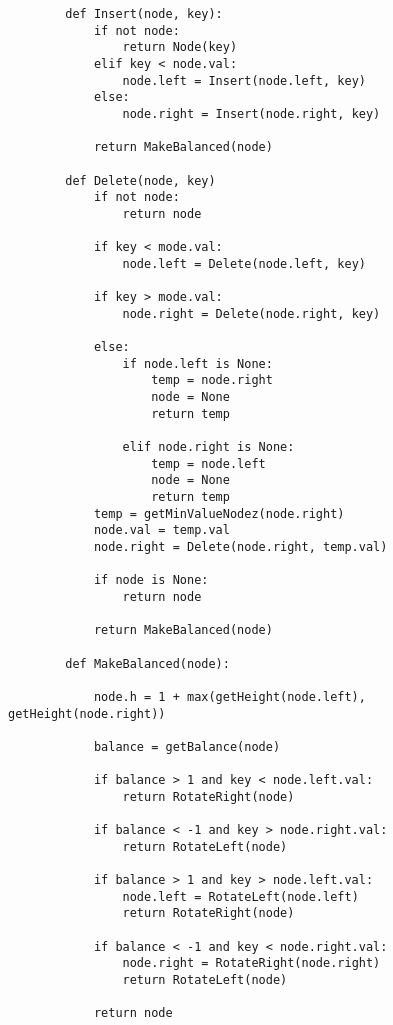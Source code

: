 \documentclass[10pt,a4paper]{article}
\begin{document}
    \begin{lstlisting}
        def Insert(node, key):
            if not node:
                return Node(key)
            elif key < node.val:
                node.left = Insert(node.left, key)
            else:
                node.right = Insert(node.right, key)
            
            return MakeBalanced(node)

        def Delete(node, key)
            if not node:
                return node
            
            if key < mode.val:
                node.left = Delete(node.left, key)
            
            if key > mode.val:
                node.right = Delete(node.right, key)
            
            else:
                if node.left is None:
                    temp = node.right
                    node = None
                    return temp
                
                elif node.right is None:
                    temp = node.left
                    node = None
                    return temp
            temp = getMinValueNodez(node.right)
            node.val = temp.val
            node.right = Delete(node.right, temp.val)

            if node is None:
                return node
        
            return MakeBalanced(node)

        def MakeBalanced(node):

            node.h = 1 + max(getHeight(node.left), getHeight(node.right))
            
            balance = getBalance(node)

            if balance > 1 and key < node.left.val:
                return RotateRight(node)

            if balance < -1 and key > node.right.val:        
                return RotateLeft(node)
         
            if balance > 1 and key > node.left.val:
                node.left = RotateLeft(node.left)        
                return RotateRight(node)
  
            if balance < -1 and key < node.right.val:
                node.right = RotateRight(node.right)
                return RotateLeft(node)
         
            return node            
        

\end{lstlisting}
\end{document}
